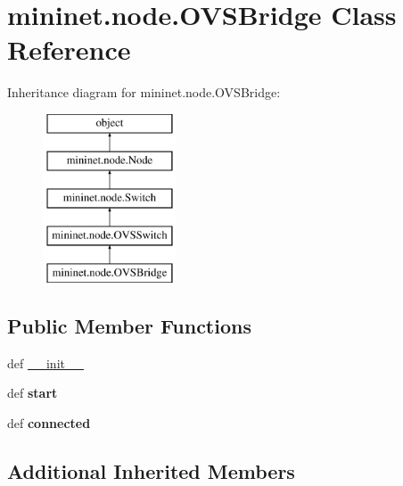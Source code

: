 \hypertarget{classmininet_1_1node_1_1OVSBridge}{\section{mininet.\-node.\-O\-V\-S\-Bridge Class Reference}
\label{classmininet_1_1node_1_1OVSBridge}
}
Inheritance diagram for mininet.\-node.\-O\-V\-S\-Bridge\-:\begin{figure}[H]
\begin{center}
\leavevmode
\includegraphics[height=5.000000cm]{classmininet_1_1node_1_1OVSBridge}
\end{center}
\end{figure}
\subsection*{Public Member Functions}
\begin{DoxyCompactItemize}
\item 
def \hyperlink{classmininet_1_1node_1_1OVSBridge_a5013ab60762b77fcdf899703c7256b14}{\-\_\-\-\_\-init\-\_\-\-\_\-}
\item 
\hypertarget{classmininet_1_1node_1_1OVSBridge_a0b9be8cb23cb358a09242807ff2fab37}{def {\bfseries start}}\label{classmininet_1_1node_1_1OVSBridge_a0b9be8cb23cb358a09242807ff2fab37}

\item 
\hypertarget{classmininet_1_1node_1_1OVSBridge_ab616ac07699ef0e09e861746a4d80265}{def {\bfseries connected}}\label{classmininet_1_1node_1_1OVSBridge_ab616ac07699ef0e09e861746a4d80265}

\end{DoxyCompactItemize}
\subsection*{Additional Inherited Members}


